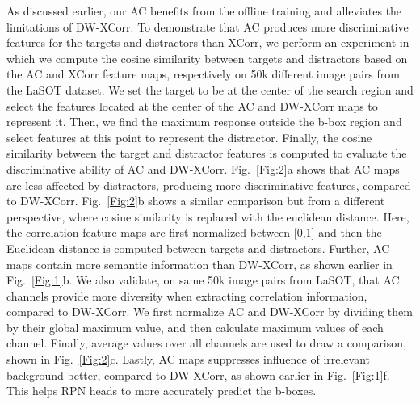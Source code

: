 \documentclass[10pt,twocolumn,letterpaper,final]{cvpr}
\begin{document}
As discussed earlier, our AC benefits from the offline training and alleviates the limitations of DW-XCorr. To demonstrate that AC produces more discriminative features for the targets and distractors than XCorr, we perform an experiment in which we compute the cosine similarity between targets and distractors based on the AC and XCorr feature maps, respectively on 50k different image pairs from the LaSOT dataset. We set the target to be at the center of the search region and select the features located at the center of the AC and DW-XCorr maps to represent it. Then, we find the maximum response outside the b-box region and select features at this point to represent the distractor. Finally, the cosine similarity between the target and distractor features is computed to evaluate the discriminative ability of AC and DW-XCorr. Fig.~\ref{Fig:2}a shows that AC maps are less affected by distractors, producing more discriminative features, compared to DW-XCorr. Fig.~\ref{Fig:2}b shows a similar comparison but from a different perspective, where cosine similarity is replaced with the euclidean distance. Here, the correlation feature maps are first normalized between [0,1] and then the Euclidean distance is computed between targets and distractors. Further, AC maps contain more semantic information than DW-XCorr, as shown earlier in Fig.~\ref{Fig:1}b. We also validate, on same 50k image pairs from LaSOT, that AC channels provide more diversity when extracting correlation information, compared to DW-XCorr. We first normalize AC and DW-XCorr by dividing them by their global maximum value, and then calculate maximum values of each channel. Finally, average values over all channels are used to draw a comparison, shown in Fig.~\ref{Fig:2}c. Lastly, AC maps suppresses influence of irrelevant background better, compared to DW-XCorr, as shown earlier in Fig.~\ref{Fig:1}f. This helps RPN heads to more accurately predict the b-boxes. 
\end{document}

